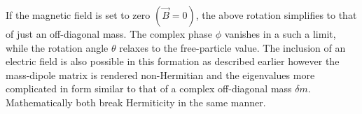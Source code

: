 If the magnetic field is set to zero $(\vec{B}=0)$, the above rotation simplifies to that of just an off-diagonal mass. The complex phase $\phi$ vanishes in a such a limit, while the rotation angle $\theta$ relaxes to the free-particle value. The inclusion of an electric field is also possible in this formation as described earlier however the mass-dipole matrix is rendered non-Hermitian and the eigenvalues more complicated in form similar to that of a complex off-diagonal mass ${\delta m}$. Mathematically both break Hermiticity in the same manner.
